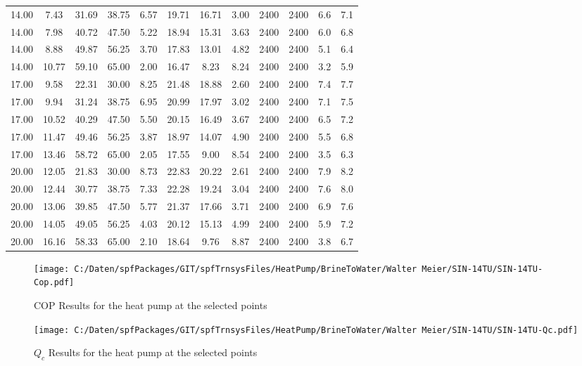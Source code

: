 \documentclass[english]{SPFShortReport}
\begin{document}
\begin{table}[!ht]
\begin{small}
\begin{center}
{\begin{tabular}{l | c c c c c c c c c c c }
14.00 & 7.43 & 31.69 & 38.75 & 6.57 & 19.71 & 16.71 & 3.00 & 2400 & 2400 & 6.6 & 7.1\\ 
14.00 & 7.98 & 40.72 & 47.50 & 5.22 & 18.94 & 15.31 & 3.63 & 2400 & 2400 & 6.0 & 6.8\\ 
14.00 & 8.88 & 49.87 & 56.25 & 3.70 & 17.83 & 13.01 & 4.82 & 2400 & 2400 & 5.1 & 6.4\\ 
14.00 & 10.77 & 59.10 & 65.00 & 2.00 & 16.47 & 8.23 & 8.24 & 2400 & 2400 & 3.2 & 5.9\\ 
17.00 & 9.58 & 22.31 & 30.00 & 8.25 & 21.48 & 18.88 & 2.60 & 2400 & 2400 & 7.4 & 7.7\\ 
17.00 & 9.94 & 31.24 & 38.75 & 6.95 & 20.99 & 17.97 & 3.02 & 2400 & 2400 & 7.1 & 7.5\\ 
17.00 & 10.52 & 40.29 & 47.50 & 5.50 & 20.15 & 16.49 & 3.67 & 2400 & 2400 & 6.5 & 7.2\\ 
17.00 & 11.47 & 49.46 & 56.25 & 3.87 & 18.97 & 14.07 & 4.90 & 2400 & 2400 & 5.5 & 6.8\\ 
17.00 & 13.46 & 58.72 & 65.00 & 2.05 & 17.55 & 9.00 & 8.54 & 2400 & 2400 & 3.5 & 6.3\\ 
20.00 & 12.05 & 21.83 & 30.00 & 8.73 & 22.83 & 20.22 & 2.61 & 2400 & 2400 & 7.9 & 8.2\\ 
20.00 & 12.44 & 30.77 & 38.75 & 7.33 & 22.28 & 19.24 & 3.04 & 2400 & 2400 & 7.6 & 8.0\\ 
20.00 & 13.06 & 39.85 & 47.50 & 5.77 & 21.37 & 17.66 & 3.71 & 2400 & 2400 & 6.9 & 7.6\\ 
20.00 & 14.05 & 49.05 & 56.25 & 4.03 & 20.12 & 15.13 & 4.99 & 2400 & 2400 & 5.9 & 7.2\\ 
20.00 & 16.16 & 58.33 & 65.00 & 2.10 & 18.64 & 9.76 & 8.87 & 2400 & 2400 & 3.8 & 6.7\\ 
\hline
\hline
\end{tabular}
}
\label{ResultsTable}
\end{center}
\end{small}
\end{table}
\begin{figure}[!ht]
\begin{center}
\texttt{[image: C:/Daten/spfPackages/GIT/spfTrnsysFiles/HeatPump/BrineToWater/Walter Meier/SIN-14TU/SIN-14TU-Cop.pdf]}
\caption{COP Results for the heat pump at the selected points}
\label{COPFig}
\end{center}
\end{figure}
\begin{figure}[!ht]
\begin{center}
\texttt{[image: C:/Daten/spfPackages/GIT/spfTrnsysFiles/HeatPump/BrineToWater/Walter Meier/SIN-14TU/SIN-14TU-Qc.pdf]}
\caption{$Q_c$ Results for the heat pump at the selected points}
\label{QcFig}
\end{center}
\end{figure}
\end{document}
